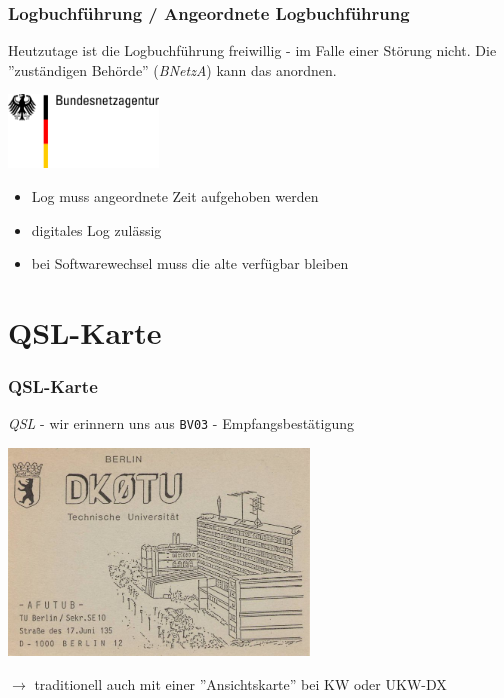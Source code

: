 \begin{frame}
    \frametitle{Logbuchführung / Angeordnete Logbuchführung}

    Heutzutage ist die Logbuchführung freiwillig - im Falle einer Störung nicht.
    Die ''zuständigen Behörde'' (\emph{BNetzA}) kann das anordnen.

    \begin{center}
        \includegraphics[width=0.3\textwidth]{bv13/Bundesnetzagentur_logo_709px.png}
        \tiny \hyperlink{refs}{\cite{wp}}
    \end{center}

    \begin{itemize}
        \item Log muss angeordnete Zeit aufgehoben werden
        \item digitales Log zulässig
        \item bei Softwarewechsel muss die alte verfügbar bleiben
    \end{itemize}

\end{frame}

\section{QSL-Karte}

\begin{frame}
    \frametitle{QSL-Karte}

    \emph{QSL} - wir erinnern uns aus \texttt{BV03} - Empfangsbestätigung \\[1em]

    \begin{center}
        \includegraphics[width=0.6\textwidth]{bv13/DK0TU_1.jpg}
    \end{center}

    $\rightarrow$ traditionell auch mit einer ''Ansichtskarte'' bei KW oder UKW-DX

\end{frame}

